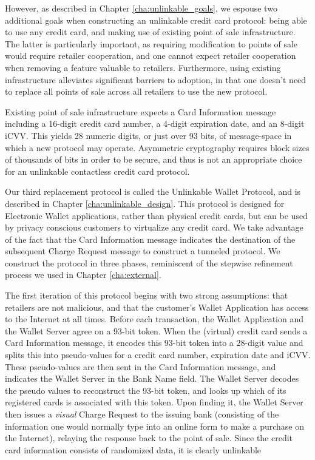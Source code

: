 
However, as described in Chapter \ref{cha:unlinkable_goals}, we espouse two additional goals when constructing an unlinkable credit card protocol:
    being able to use any credit card, and making use of existing point of sale infrastructure.
The latter is particularly important, as requiring modification to points of sale would require retailer cooperation,
    and one cannot expect retailer cooperation when removing a feature valuable to retailers.
Furthermore, using existing infrastructure alleviates significant barriers to adoption, in that one doesn't need to replace all points of sale across all retailers to use the new protocol.

Existing point of sale infrastructure expects a Card Information message including a 16-digit credit card number, a 4-digit expiration date, and an 8-digit iCVV.
This yields 28 numeric digits, or just over 93 bits, of message-space in which a new protocol may operate.
Asymmetric cryptography requires block sizes of thousands of bits in order to be secure, and thus is not an appropriate choice for an unlinkable contactless credit card protocol.


Our third replacement protocol is called the Unlinkable Wallet Protocol, and is described in Chapter \ref{cha:unlinkable_design}.
This protocol is designed for Electronic Wallet applications, rather than physical credit cards, but can be used by privacy conscious customers to virtualize any credit card.
We take advantage of the fact that the Card Information message indicates the destination of the subsequent Charge Request message to construct a tunneled protocol.
We construct the protocol in three phases, reminiscent of the stepwise refinement process we used in Chapter \ref{cha:external}.

The first iteration of this protocol begins with two strong assumptions:
    that retailers are not malicious, and that the customer's Wallet Application has access to the Internet at all times.
Before each transaction, the Wallet Application and the Wallet Server agree on a 93-bit token.
When the (virtual) credit card sends a Card Information message, it encodes this 93-bit token into a 28-digit value and splits this into pseudo-values for a credit card number, expiration date and iCVV.
These pseudo-values are then sent in the Card Information message, and indicates the Wallet Server in the Bank Name field.
The Wallet Server decodes the pseudo values to reconstruct the 93-bit token, and looks up which of its registered cards is associated with this token.
Upon finding it, the Wallet Server then issues a \emph{visual} Charge Request to the issuing bank
    (consisting of the information one would normally type into an online form to make a purchase on the Internet),
    relaying the response back to the point of sale.
Since the credit card information consists of randomized data, it is clearly unlinkable

